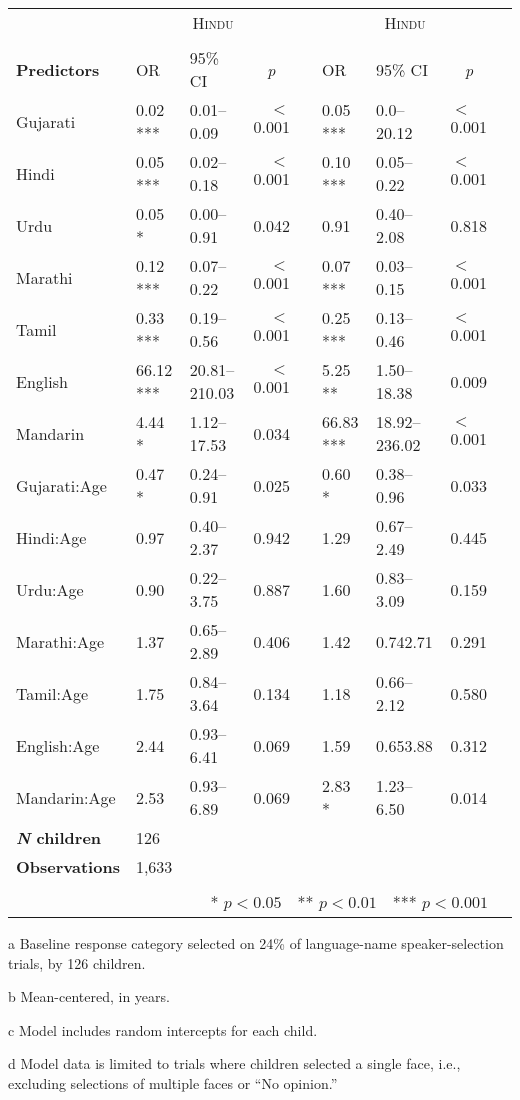 \begin{table}[ht]
\begin{threeparttable}
\begin{tabular}{lllrllllr}
& \multicolumn{3}{c}{\textsc{Hindu}\tnote{a}} & & \multicolumn{3}{c}{\textsc{Hindu}\tnote{a}} \\
\cline{2-4} \cline{6-8} \\[-.75em]
\textbf{Predictors} & OR & 95\% CI & \multicolumn{1}{c}{\textit{p}} & & OR & 95\% CI & \multicolumn{1}{c}{\textit{p}} \\ 
\midrule
Gujarati & 0.02 *** & 0.01--0.09 & $<$0.001 &  & 0.05 *** & 0.0--20.12 & $<$0.001 \\ 
Hindi & 0.05 *** & 0.02--0.18 & $<$0.001 &  & 0.10 *** & 0.05--0.22 & $<$0.001 \\ 
Urdu & 0.05 * & 0.00--0.91 & 0.042 &  & 0.91 & 0.40--2.08 & 0.818 \\ 
Marathi & 0.12 *** & 0.07--0.22 & $<$0.001 &  & 0.07 *** & 0.03--0.15 & $<$0.001 \\ 
Tamil & 0.33 *** & 0.19--0.56 & $<$0.001 &  & 0.25 *** & 0.13--0.46 & $<$0.001 \\ 
English & 66.12 *** & 20.81--210.03 & $<$0.001 &  & 5.25 ** & 1.50--18.38 & 0.009 \\ 
Mandarin & 4.44 * & 1.12--17.53 & 0.034 &  & 66.83 *** & 18.92--236.02 & $<$0.001 \\ 
Gujarati:Age\tnote{b} & 0.47 * & 0.24--0.91 & 0.025 &  & 0.60 * & 0.38--0.96 & 0.033 \\ 
Hindi:Age\tnote{b} & 0.97 & 0.40--2.37 & 0.942 &  & 1.29 & 0.67--2.49 & 0.445 \\ 
Urdu:Age\tnote{b} & 0.90 & 0.22--3.75 & 0.887 &  & 1.60 & 0.83--3.09 & 0.159 \\ 
Marathi:Age\tnote{b} & 1.37 & 0.65--2.89 & 0.406 &  & 1.42 & 0.742.71 & 0.291 \\ 
Tamil:Age\tnote{b} & 1.75 & 0.84--3.64 & 0.134 &  & 1.18 & 0.66--2.12 & 0.580 \\ 
English:Age\tnote{b} & 2.44 & 0.93--6.41 & 0.069 &  & 1.59 & 0.653.88 & 0.312 \\ 
Mandarin:Age\tnote{b} & 2.53 & 0.93--6.89 & 0.069 &  & 2.83 * & 1.23--6.50 & 0.014 \\ 
\midrule
\bfseries{\textit{N} children}\tnote{c} & 126   &  &  &  &  &  &  \\
\textbf{Observations}\tnote{d} & 1,633  &  &  &  &  &  &  \\
\bottomrule\\[-.75em]
\multicolumn{8}{r}{* $p<0.05$~~** $p<0.01$~~*** $p<0.001$}\\
\end{tabular}
\begin{tablenotes}[flushleft]
    \item[a] Baseline response category selected on 24\% of language-name speaker-selection trials, by 126 children. %
    \item[b] Mean-centered, in years.
    \item[c] Model includes random intercepts for each child.
    \item[d] Model data is limited to trials where children selected a single face, i.e., excluding selections of multiple faces or ``No opinion.'' 
\end{tablenotes}
\end{threeparttable}
\end{table}
